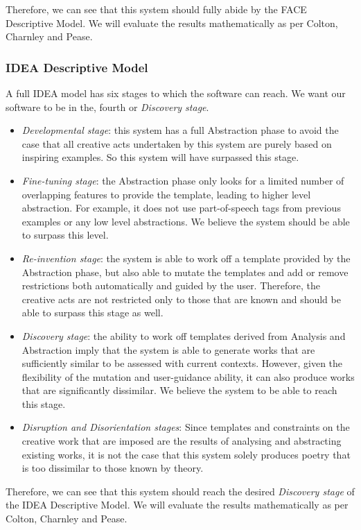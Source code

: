 Therefore, we can see that this system should fully abide by the FACE Descriptive Model. We will evaluate the results mathematically as per Colton, Charnley and Pease.

\subsubsection{IDEA Descriptive Model}
\label{sec:idea}
A full IDEA model has six stages to which the software can reach. We want our software to be in the, fourth or \emph{Discovery stage}.

\begin{itemize}
\setlength{\itemsep}{0pt}
\item{\emph{Developmental stage}: this system has a full Abstraction phase to avoid the case that all creative acts undertaken by this system are purely based on inspiring examples. So this system will have surpassed this stage.}
\item{\emph{Fine-tuning stage}: the Abstraction phase only looks for a limited number of overlapping features to provide the template, leading to higher level abstraction. For example, it does not use part-of-speech tags from previous examples or any low level abstractions. We believe the system should be able to surpass this level.}
\item{\emph{Re-invention stage}: the system is able to work off a template provided by the Abstraction phase, but also able to mutate the templates and add or remove restrictions both automatically and guided by the user. Therefore, the creative acts are not restricted only to those that are known and should be able to surpass this stage as well.}
\item{\emph{Discovery stage}: the ability to work off templates derived from Analysis and Abstraction imply that the system is able to generate works that are sufficiently similar to be assessed with current contexts. However, given the flexibility of the mutation and user-guidance ability, it can also produce works that are significantly dissimilar. We believe the system to be able to reach this stage.}
\item{\emph{Disruption and Disorientation stages}: Since templates and constraints on the creative work that are imposed are the results of analysing and abstracting existing works, it is not the case that this system solely produces poetry that is too dissimilar to those known by theory. }
\end{itemize}

Therefore, we can see that this system should reach the desired \emph{Discovery stage} of the IDEA Descriptive Model. We will evaluate the results mathematically as per Colton, Charnley and Pease.

